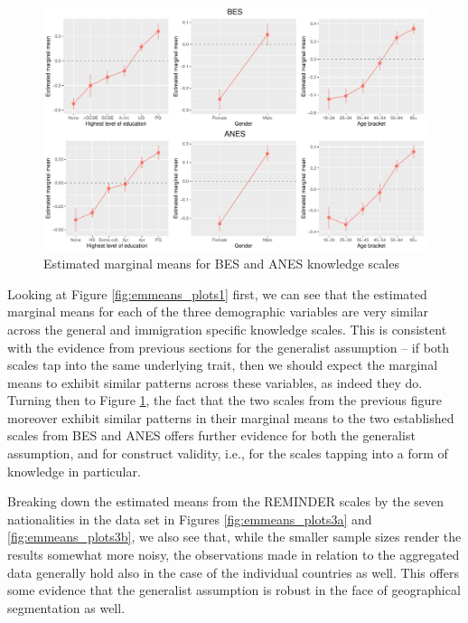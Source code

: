 \documentclass[11pt,halfline,a4paper,]{ouparticle}
\begin{document}
\begin{figure}[!h]
\includegraphics[width=1\linewidth]{Revisiting-the-Measurement-and-Dimensionality-of-Political-Knowledge--Evidence-from-Seven-European-Countries_files/figure-latex/emmeans_plots2-1} \caption{Estimated marginal means for BES and ANES knowledge scales}\label{fig:emmeans_plots2}
\end{figure}

Looking at Figure \ref{fig:emmeans_plots1} first, we can see that the
estimated marginal means for each of the three demographic variables are
very similar across the general and immigration specific knowledge
scales. This is consistent with the evidence from previous sections for
the generalist assumption -- if both scales tap into the same underlying
trait, then we should expect the marginal means to exhibit similar
patterns across these variables, as indeed they do. Turning then to
Figure \ref{fig:emmeans_plots2}, the fact that the two scales from the
previous figure moreover exhibit similar patterns in their marginal
means to the two established scales from BES and ANES offers further
evidence for both the generalist assumption, and for construct validity,
i.e., for the scales tapping into a form of knowledge in particular.

Breaking down the estimated means from the REMINDER scales by the seven
nationalities in the data set in Figures \ref{fig:emmeans_plots3a} and
\ref{fig:emmeans_plots3b}, we also see that, while the smaller sample
sizes render the results somewhat more noisy, the observations made in
relation to the aggregated data generally hold also in the case of the
individual countries as well. This offers some evidence that the
generalist assumption is robust in the face of geographical segmentation
as well.
\end{document}
